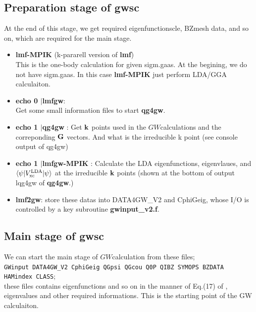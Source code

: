 \documentclass[a4paper,10pt,epsf,fleqn]{article}
\newcommand{\GW}{$GW$}
\newcommand{\exe}[1]{{\bf #1}}
\newcommand{\io}[1]{{\sf  #1}}
\begin{document}
\subsection{\bf Preparation stage of \exe{gwsc}}
At the end of this stage, 
we get required eigenfunctionscle, BZmesh data, and so on,
which are required for the main stage.
\begin{itemize}
\item \exe{lmf-MPIK} (k-pararell version of \exe{lmf})\\
This is the one-body calculation for given \io{sigm.gaas}.
At the begining, we do not have \io{sigm.gaas}.
In this case \exe{lmf-MPIK} just perform LDA/GGA calculaiton. 
\item{\bf echo 0 $|$lmfgw}: \\
  Get some small information files to start {\bf qg4gw}.
\item{\bf echo 1 $|$qg4gw }: Get ${\bf k}$ points used
  in the \GW calculations and the correponding ${\bf G}$ vectors.
  And what is the irreducible k point (see console output of qg4gw)
\item{\bf echo 1 $|$lmfgw-MPIK} : 
 Calculate the LDA eigenfunctions, eigenvlaues, and
 $\langle \psi | V^{\rm LDA}_{\rm xc}| \psi \rangle$
 at the irreducible ${\bf k}$ points (shown at the bottom of output
     \io{lqg4gw} of \exe{qg4gw}.)
\item{\bf lmf2gw}: store these datas into {\sf DATA4GW\_V2} and {\sf CphiGeig}, 
whose I/O is controlled by a key subroutine {\bf gwinput\_v2.f}.
\end{itemize}

\subsection{\bf Main stage of \exe{gwsc}}
\label{mainstage}
We can start the main stage of \GW calculation from these files;\\
\verb#GWinput DATA4GW_V2 CphiGeig QGpsi QGcou Q0P QIBZ SYMOPS BZDATA HAMindex CLASS#;\\
\noindent these files contains eigenfunctions and so on in the manner 
of Eq.(17) of \cite{jsj83094771}, eigenvalues and other required
informations. This is the starting point of the GW calculaiton.\\
\end{document}
